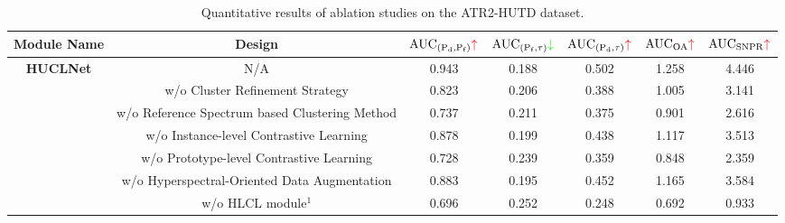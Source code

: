 \begin{table*}[!ht] 
    \centering
    \footnotesize   
    \caption{Quantitative results of ablation studies on the ATR2-HUTD dataset.} \label{ablation study}
    \renewcommand{\arraystretch}{2}
    \setlength{\tabcolsep}{2.5mm}
    \begin{threeparttable}
        \scalebox{0.975}
        { 
    \begin{tabular}{ccccccc}
        \hline
        \textbf{Module Name}                  & \textbf{Design}                                                      & $\text{AUC}_{( \mathrm{P}_{\mathrm{d}},\mathrm{P}_{\mathrm{f}})}\textcolor{red}{\uparrow }$ & $\text{AUC}_{( \mathrm{P}_{\mathrm{f}}, \tau)}\textcolor{green}{\downarrow }$ & $\text{AUC}_{( \mathrm{P}_{\mathrm{d}},\tau)}\textcolor{red}{\uparrow }$ & $\mathrm{AUC}_{\mathrm{OA}} \textcolor{red}{\uparrow }$ & $\mathrm{AUC}_{\mathrm{SNPR}}\textcolor{red}{\uparrow }$  \\ \hline
        \rowcolor{tablecolor0!50}
        \textbf{HUCLNet}                                          & N/A & 0.943 & 0.188 & 0.502 & 1.258 & 4.446 \\
        \rowcolor{tablecolor1!50}
        \cellcolor{tablecolor1!50}                             & w/o Cluster Refinement Strategy                             & 0.823 & 0.206 & 0.388 & 1.005 & 3.141 \\
        \rowcolor{tablecolor1!50}
        \multirow{-2}{*}{\cellcolor{tablecolor1!50}\textbf{RGC module}}  & w/o Reference Spectrum based Clustering Method & 0.737 & 0.211 & 0.375 & 0.901 & 2.616 \\
        \rowcolor{tablecolor2!50} 
        \cellcolor{tablecolor2!50}                              & w/o Instance-level Contrastive Learning                     & 0.878 & 0.199 & 0.438 & 1.117 & 3.513 \\
        \rowcolor{tablecolor2!50} 
        \cellcolor{tablecolor2!50}                              & w/o Prototype-level Contrastive Learning                    & 0.728 & 0.239 & 0.359 & 0.848 & 2.359 \\
        \rowcolor{tablecolor2!50}
        \cellcolor{tablecolor2!50}                              & w/o Hyperspectral-Oriented Data Augmentation                    & 0.883 & 0.195 & 0.452 & 1.165 & 3.584 \\
        \rowcolor{tablecolor2!50} 
        \multirow{-4}{*}{\cellcolor{tablecolor2!50}\textbf{HLCL module}} & w/o HLCL module$^{1}$                                             & 0.696 & 0.252 & 0.248 & 0.692 & 0.933 \\

\end{tabular}}
\end{threeparttable}
\end{table*}
